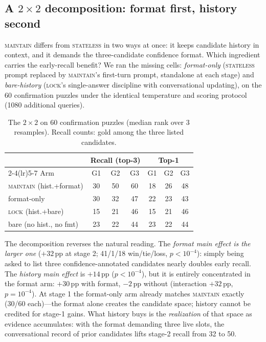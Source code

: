 \documentclass[10pt]{article}
\newcommand{\Mstate}{\textsc{stateless}}
\newcommand{\Mlock}{\textsc{lock}}
\newcommand{\Mmaint}{\textsc{maintain}}
\begin{document}
\subsection{A $2\times2$ decomposition: format first, history second}
\label{sec:twobytwo}

\Mmaint{} differs from \Mstate{} in two ways at once: it keeps candidate
history in context, and it demands the three-candidate confidence format.
Which ingredient carries the early-recall benefit? We ran the missing
cells: \emph{format-only} (\Mstate{} prompt replaced by \Mmaint{}'s
first-turn prompt, standalone at each stage) and \emph{bare-history}
(\Mlock{}'s single-answer discipline with conversational updating), on
the 60 confirmation puzzles under the identical temperature and scoring
protocol (1080 additional queries).

\begin{table}[h]
\centering
\small
\begin{tabular}{lcccccc}
\toprule
 & \multicolumn{3}{c}{Recall (top-3)} & \multicolumn{3}{c}{Top-1} \\
\cmidrule(lr){2-4}\cmidrule(lr){5-7}
Arm & G1 & G2 & G3 & G1 & G2 & G3 \\
\midrule
\Mmaint{} (hist.+format) & 30 & 50 & 60 & 18 & 26 & 48 \\
format-only             & 30 & 32 & 47 & 22 & 23 & 43 \\
\Mlock{} (hist.+bare)    & 15 & 21 & 46 & 15 & 21 & 46 \\
bare (no hist., no fmt) & 23 & 22 & 44 & 23 & 22 & 44 \\
\bottomrule
\end{tabular}
\caption{The $2\times2$ on 60 confirmation puzzles (median rank over
3 resamples). Recall counts: gold among the three listed candidates.}
\label{tab:twobytwo}
\end{table}

The decomposition reverses the natural reading. The \emph{format main
effect is the larger one} ($+32$\,pp at stage 2; 41/1/18 win/tie/loss,
$p < 10^{-4}$): simply being asked to list three confidence-annotated
candidates nearly doubles early recall. The \emph{history main effect}
is $+14$\,pp ($p < 10^{-4}$), but it is entirely concentrated in the
format arm: $+30$\,pp with format, $-2$\,pp without (interaction $+32$\,pp,
$p = 10^{-4}$). At stage 1 the format-only arm already matches \Mmaint{}
exactly (30/60 each)---the format alone creates the candidate space;
history cannot be credited for stage-1 gains. What history buys is the
\emph{realization} of that space as evidence accumulates: with the
format demanding three live slots, the conversational record of prior
candidates lifts stage-2 recall from 32 to 50.
\end{document}
